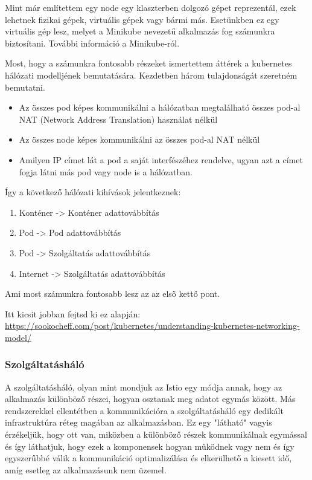 \documentclass[a4paper,oneside]{article}
\begin{document}
Mint már említettem egy node egy klaszterben dolgozó gépet reprezentál, ezek
lehetnek fizikai gépek, virtuális gépek vagy bármi más. Esetünkben ez egy
virtuális gép lesz, melyet a Minikube nevezetű alkalmazás fog számunkra biztosítani.
További információ a Minikube-ról. ~\cite{minikube}

Most, hogy a számunkra fontosabb részeket ismertettem áttérek a kubernetes
hálózati modelljének bemutatására. Kezdetben három tulajdonságát szeretném
bemutatni.
\begin{itemize}
	\item Az összes pod képes kommunikálni a hálózatban megtalálható összes
	pod-al NAT (Network Address Translation) használat nélkül
	\item Az összes node képes kommunikálni az összes pod-al NAT nélkül
	\item Amilyen IP címet lát a pod a saját interfészéhez rendelve, ugyan
	azt a címet fogja látni más pod vagy node is a hálózatban.
\end{itemize}
Így a következő hálózati kihívások jelentkeznek:
\begin{enumerate}
	\item Konténer -> Konténer adattovábbítás
	\item Pod -> Pod adattovábbítás
	\item Pod -> Szolgáltatás adattovábbítás
	\item Internet -> Szolgáltatás adattovábbítás
\end{enumerate}
Ami most számunkra fontosabb lesz az az első kettő pont.

Itt kicsit jobban fejtsd ki ez alapján: \\
\url{https://sookocheff.com/post/kubernetes/understanding-kubernetes-networking-model/}

\subsubsection{Szolgáltatásháló}
A szolgáltatásháló, olyan mint mondjuk az Istio egy módja annak, hogy az
alkalmazás különböző részei, hogyan osztanak meg adatot egymás között.
Más rendszerekkel ellentétben a kommunikációra a szolgáltatásháló egy
dedikált infrastruktúra réteg magában az alkalmazásban. Ez egy "látható"
vagyis érzékeljük, hogy ott van, miközben a különböző részek kommunikálnak
egymással és így láthatjuk, hogy ezek a komponensek hogyan működnek vagy
nem és így egyszerűbbé válik a kommunikáció optimalizálása és elkerülhető
a kiesett idő, amíg esetleg az alkalmazásunk nem üzemel.
\end{document}
